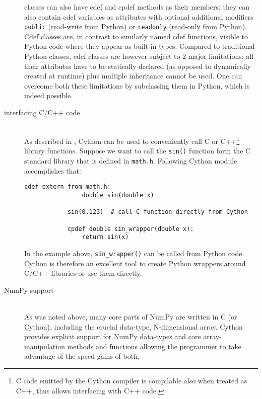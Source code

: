 \begin{description}
		classes can also have cdef and cpdef methods as their members; they can also contain cdef
		variables as attributes with optional additional modifiers \verb|public| (read-write from
		Python) or \verb|readonly| (read-only from Python). Cdef classes are, in contrast to similarly
		named cdef functions, visible to Python code where they appear as built-in types. Compared
		to traditional Python classes, cdef classes are however subject to 2 major limitations: all
		their attributes have to be statically declared (as opposed to dynamically created at
		runtime) plus multiple inheritance cannot be used. One can overcome both these limitations
		by subclassing them in Python, which is indeed possible.
	\item[interfacing C/C++ code] \hfill \\
		As described in \cite{BehBraSel:09}, Cython can be used to conveniently call C or
		C++\footnote{C code emitted by the Cython compiler is compilable also when treated as C++,
		thus allows interfacing with C++ code.} library functions. Suppose we want to call the
		\verb|sin()| function form the C standard library that is defined in \verb|math.h|. Following
		Cython module accomplishes that:
		\vspace{\parskip}
		\begin{Verbatim}[samepage=true,gobble=3,label=sin\_wrapper.pyx,frame=single]
			cdef extern from math.h:
			    double sin(double x)

			sin(0.123)  # call C function directly from Cython

			cpdef double sin_wrapper(double x):
			    return sin(x)
		\end{Verbatim}
		In the example above, \verb|sin_wrapper()| can be called from Python code. Cython is
		therefore an excellent tool to create Python wrappers around C/C++ libraries or use them
		directly.
	\item[NumPy support] \hfill \\
		As was noted above, many core parts of NumPy are written in C (or Cython), including the
		crucial data-type, N-dimensional array. Cython provides explicit support for NumPy
		data-types and core array-manipulation methods and functions allowing the programmer to
		take advantage of the speed gains of both.~\cite{Sel:09}


\end{description}
